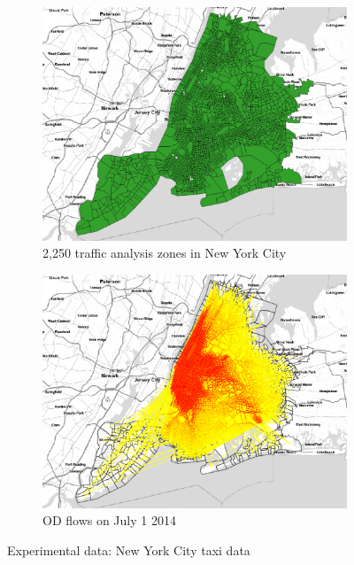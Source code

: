 \documentclass[a4paper,UKenglish]{lipics-v2018}
\begin{document}
\begin{figure}
	\centering
	\begin{subfigure}[b]{0.49\textwidth}
		\includegraphics[width=\textwidth]{images/taxizone.eps}
		\caption{2,250 traffic analysis zones in New York City}
		\label{fig:taxizone}
	\end{subfigure}
	\hfill
	\begin{subfigure}[b]{0.49\textwidth}
		\includegraphics[width=\textwidth]{images/July1st_pic2.eps}
		\caption{OD flows on July 1 2014}
		\label{fig:ODflows}
	\end{subfigure}
	\caption{Experimental data: New York City taxi data}\label{fig:taxi_data}	
\end{figure}
\end{document}
